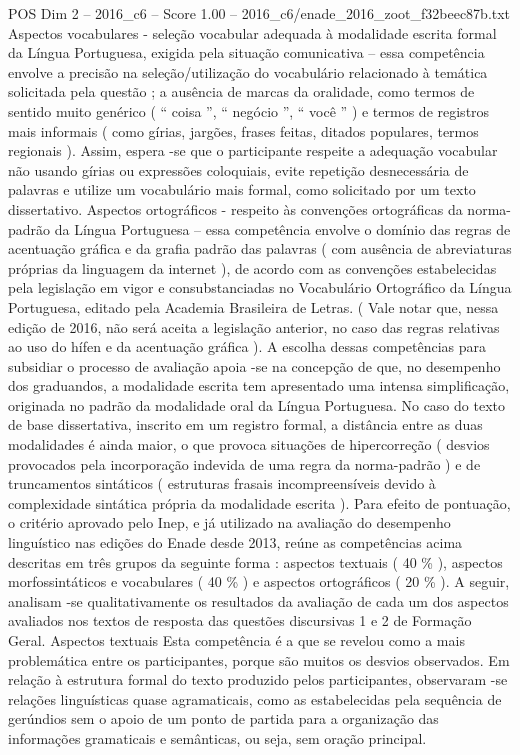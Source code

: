 \begin{textsample}{POS Dim 2 – 2016\_c6 – Score 1.00 – 2016\_c6/enade\_2016\_zoot\_f32beec87b.txt}
Aspectos vocabulares - seleção vocabular adequada à modalidade escrita formal da Língua Portuguesa, exigida pela situação comunicativa – essa competência envolve a precisão na seleção/utilização do vocabulário relacionado à temática solicitada pela questão ; a ausência de marcas da oralidade, como termos de sentido muito genérico ( “ coisa ”, “ negócio ”, “ você ” ) e termos de registros mais informais ( como gírias, jargões, frases feitas, ditados populares, termos regionais ).
Assim, espera -se que o participante respeite a adequação vocabular não usando gírias ou expressões coloquiais, evite repetição desnecessária de palavras e utilize um vocabulário mais formal, como solicitado por um texto dissertativo.
Aspectos ortográficos - respeito às convenções ortográficas da norma-padrão da Língua Portuguesa – essa competência envolve o domínio das regras de acentuação gráfica e da grafia padrão das palavras ( com ausência de abreviaturas próprias da linguagem da internet ), de acordo com as convenções estabelecidas pela legislação em vigor e consubstanciadas no Vocabulário Ortográfico da Língua Portuguesa, editado pela Academia Brasileira de Letras. ( Vale notar que, nessa edição de 2016, não será aceita a legislação anterior, no caso das regras relativas ao uso do hífen e da acentuação gráfica ).
A escolha dessas competências para subsidiar o processo de avaliação apoia -se na concepção de que, no desempenho dos graduandos, a modalidade escrita tem apresentado uma intensa simplificação, originada no padrão da modalidade oral da Língua Portuguesa.
No caso do texto de base dissertativa, inscrito em um registro formal, a distância entre as duas modalidades é ainda maior, o que provoca situações de hipercorreção ( desvios provocados pela incorporação indevida de uma regra da norma-padrão ) e de truncamentos sintáticos ( estruturas frasais incompreensíveis devido à complexidade sintática própria da modalidade escrita ).
Para efeito de pontuação, o critério aprovado pelo Inep, e já utilizado na avaliação do desempenho linguístico nas edições do Enade desde 2013, reúne as competências acima descritas em três grupos da seguinte forma : aspectos textuais ( 40 \% ), aspectos morfossintáticos e vocabulares ( 40 \% ) e aspectos ortográficos ( 20 \% ).
A seguir, analisam -se qualitativamente os resultados da avaliação de cada um dos aspectos avaliados nos textos de resposta das questões discursivas 1 e 2 de Formação Geral.
Aspectos textuais Esta competência é a que se revelou como a mais problemática entre os participantes, porque são muitos os desvios observados.
Em relação à estrutura formal do texto produzido pelos participantes, observaram -se relações linguísticas quase agramaticais, como as estabelecidas pela sequência de gerúndios sem o apoio de um ponto de partida para a organização das informações gramaticais e semânticas, ou seja, sem oração principal.

\end{textsample}
